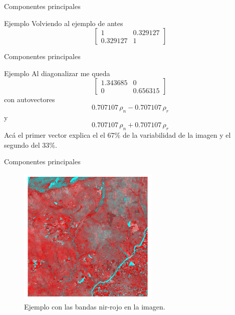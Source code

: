 \documentclass[]{beamer}
\begin{document}
\begin{frame}{Componentes principales}
  \begin{exampleblock}{Ejemplo}
    Volviendo al ejemplo de antes
    \[
    \begin{bmatrix}
        1       & 0.329127 \\
        0.329127 & 1
    \end{bmatrix} \]
  \end{exampleblock}
\end{frame}

\begin{frame}{Componentes principales}
  \begin{exampleblock}{Ejemplo}
    Al diagonalizar me queda
    \[
    \begin{bmatrix}
        1.343685       & 0 \\
        0       & 0.656315
    \end{bmatrix} \]
    con autovectores $$0.707107\, \rho_n-0.707107 \, \rho_r$$  y $$0.707107 \,
      \rho_n+0.707107\, \rho_r$$ \pause\@
    Acá el primer vector explica el el 67\% de la variabilidad de la imagen y el segundo del 33\%.
  \end{exampleblock}
\end{frame}

\begin{frame}{Componentes principales}
  \begin{figure}
  \centering
  \includegraphics[width=0.6\textwidth]{imagenes/pca1.png}
  \caption{Ejemplo con las bandas nir-rojo en la imagen.}
  \end{figure}
\end{frame}
\end{document}
